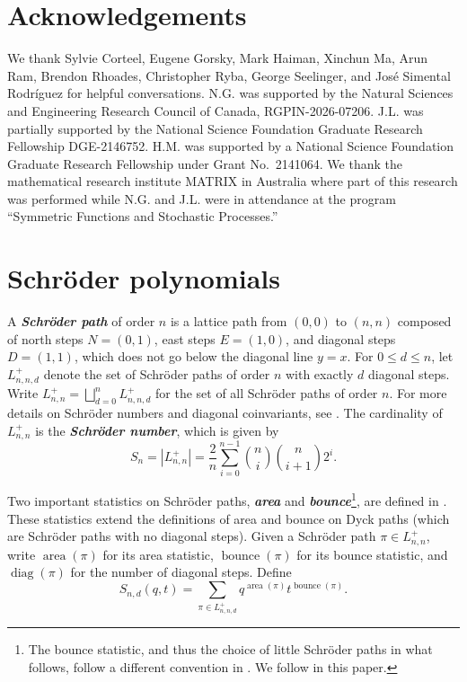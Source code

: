 \documentclass[11pt, noadjust, reqno]{amsart}
\theoremstyle{definition}
\theoremstyle{remark}
\numberwithin{equation}{section}
\newcommand{\0}{\emptyset}
\DeclareMathOperator{\area}{area}
\DeclareMathOperator{\bounce}{bounce}
\DeclareMathOperator{\diag}{diag}
\newcommand{\newword}[1]{\emph{\textbf{#1}}}
\begin{document}
\section*{Acknowledgements}

We thank Sylvie Corteel, Eugene Gorsky, Mark Haiman, Xinchun Ma, Arun Ram, Brendon Rhoades, Christopher Ryba, George Seelinger, and José Simental Rodríguez for helpful conversations.
N.G. was supported by the Natural Sciences and Engineering Research Council of Canada, RGPIN-2026-07206. 
J.L. was partially supported by the National Science Foundation Graduate Research Fellowship DGE-2146752. H.M. was supported by a National Science Foundation Graduate Research Fellowship under Grant No.\ 2141064.
We thank the mathematical research institute MATRIX in Australia where part of this research was performed while N.G. and J.L. were in attendance at the program ``Symmetric Functions and Stochastic Processes.''




\section{Schr\"oder polynomials}\label{sec:Schroder-polynomials}

A \newword{Schr\"oder path} of order $n$ is a lattice path from $(0,0)$ to $(n,n)$ composed of north steps $N = (0,1)$, east steps $E = (1,0)$, and diagonal steps $D = (1,1)$, which does not go below the diagonal line $y=x$.
For $0 \leq d \leq n$, let $L_{n,n,d}^+$ denote the set of Schr\"oder paths of order $n$ with exactly $d$ diagonal steps. 
Write $L_{n,n}^+ = \bigsqcup_{d=0}^{n} L_{n,n,d}^+$ for the set of all Schr\"oder paths of order $n$.
For more details on Schr\"oder numbers and diagonal coinvariants, see \cite[Chapter 4]{Haglund2008}. 
The cardinality of $L_{n,n}^+$ is the \newword{Schr\"oder number}, which is given by
\begin{equation*}
    S_n = \left|L_{n,n}^+\right| = \frac{2}{n} \sum_{i=0}^{n-1} \binom{n}{i} \binom{n}{i+1} 2^i.
\end{equation*}

Two important statistics on Schr\"oder paths, \newword{area} and \newword{bounce}\footnote{The bounce statistic, and thus the choice of little Schr\"oder paths in what follows, follow a different convention in \cite{EggeHaglundKillpatrickKremer}. We follow \cite{Haglund2008} in this paper.}, are defined in \cite[Chapter 4]{Haglund2008}.
These statistics extend the definitions of area and bounce on Dyck paths (which are Schr\"oder paths with no diagonal steps).
Given a Schr\"oder path $\pi \in L_{n,n}^+$, write $\area(\pi)$ for its area statistic, $\bounce(\pi)$ for its bounce statistic, and $\diag(\pi)$ for the number of diagonal steps.
Define
\begin{equation*}
    S_{n,d}(q,t) = \sum_{\pi \in L_{n,n,d}^+} q^{\area(\pi)} t^{\bounce(\pi)}.
\end{equation*}
\end{document}
